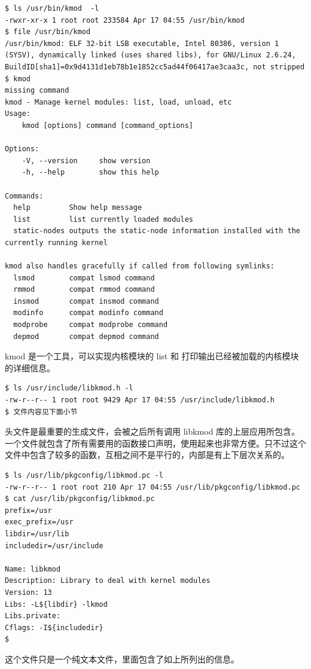 \documentclass[11pt,a4paper]{article}
\begin{document}
{\begin{shaded}\begin{verbatim}
$ ls /usr/bin/kmod  -l
-rwxr-xr-x 1 root root 233584 Apr 17 04:55 /usr/bin/kmod
$ file /usr/bin/kmod
/usr/bin/kmod: ELF 32-bit LSB executable, Intel 80386, version 1 (SYSV), dynamically linked (uses shared libs), for GNU/Linux 2.6.24, BuildID[sha1]=0x9d4131d1eb78b1e1852cc5ad44f06417ae3caa3c, not stripped
$ kmod
missing command
kmod - Manage kernel modules: list, load, unload, etc
Usage:
    kmod [options] command [command_options]

Options:
    -V, --version     show version
    -h, --help        show this help

Commands:
  help         Show help message
  list         list currently loaded modules
  static-nodes outputs the static-node information installed with the currently running kernel

kmod also handles gracefully if called from following symlinks:
  lsmod        compat lsmod command
  rmmod        compat rmmod command
  insmod       compat insmod command
  modinfo      compat modinfo command
  modprobe     compat modprobe command
  depmod       compat depmod command
\end{verbatim}\end{shaded}}
kmod 是一个工具，可以实现内核模块的 list 和
打印输出已经被加载的内核模块的详细信息。

{\begin{shaded}\begin{verbatim}
$ ls /usr/include/libkmod.h -l
-rw-r--r-- 1 root root 9429 Apr 17 04:55 /usr/include/libkmod.h
$ 文件内容见下面小节
\end{verbatim}\end{shaded}}
头文件是最重要的生成文件，会被之后所有调用 libkmod
库的上层应用所包含。一个文件就包含了所有需要用的函数接口声明，使用起来也非常方便。只不过这个文件中包含了较多的函数，互相之间不是平行的，内部是有上下层次关系的。

{\begin{shaded}\begin{verbatim}
$ ls /usr/lib/pkgconfig/libkmod.pc -l
-rw-r--r-- 1 root root 210 Apr 17 04:55 /usr/lib/pkgconfig/libkmod.pc
$ cat /usr/lib/pkgconfig/libkmod.pc 
prefix=/usr
exec_prefix=/usr
libdir=/usr/lib
includedir=/usr/include

Name: libkmod
Description: Library to deal with kernel modules
Version: 13
Libs: -L${libdir} -lkmod
Libs.private:  
Cflags: -I${includedir}
$ 
\end{verbatim}\end{shaded}}
这个文件只是一个纯文本文件，里面包含了如上所列出的信息。
\end{document}
